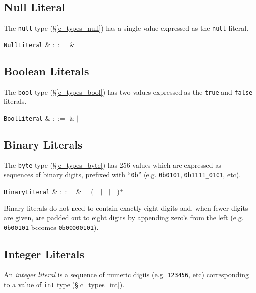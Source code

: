 \subsection{Null Literal}

The \lstinline{null} type (\S\ref{c_types_null}) has a single value expressed as the \lstinline{null} literal.

\begin{syntax}
  \verb+NullLiteral+ & $::=$ &  \\
\end{syntax}


\subsection{Boolean Literals}

The \lstinline{bool} type (\S\ref{c_types_bool}) has two values expressed as the \lstinline{true} and \lstinline{false} literals.

\begin{syntax}
  \verb+BoolLiteral+ & $::=$ &  $|$  \\
\end{syntax}


\subsection{Binary Literals}

The \lstinline{byte} type (\S\ref{c_types_byte}) has 256 values which are expressed as sequences of binary digits, prefixed with ``\lstinline{0b}'' (e.g. \lstinline{0b0101}, \lstinline{0b1111_0101}, etc).


\begin{syntax}
 \verb+BinaryLiteral+ & $::=$ & \ \ \big(\ \ $|$\  $|$\ \token{\_}\ \big)$^+$\\
\end{syntax}

Binary literals do not need to contain exactly eight digits and, when fewer digits are given, are padded out to eight digits by appending zero's from the left (e.g. \lstinline{0b00101} becomes \lstinline{0b00000101}).


\subsection{Integer Literals}

An {\em integer literal} is a sequence of numeric digits (e.g. \lstinline{123456}, etc) corresponding to a value of \lstinline{int} type (\S\ref{c_types_int}).

